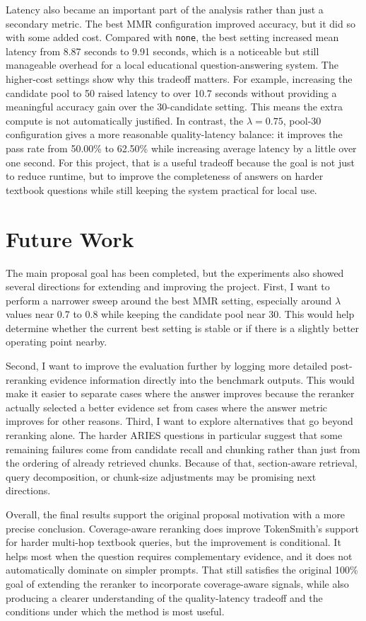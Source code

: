 \documentclass[sigconf]{acmart}
\begin{document}
Latency also became an important part of the analysis rather than just a secondary metric. The best MMR configuration improved accuracy, but it did so with some added cost. Compared with \texttt{none}, the best setting increased mean latency from 8.87 seconds to 9.91 seconds, which is a noticeable but still manageable overhead for a local educational question-answering system. The higher-cost settings show why this tradeoff matters. For example, increasing the candidate pool to 50 raised latency to over 10.7 seconds without providing a meaningful accuracy gain over the 30-candidate setting. This means the extra compute is not automatically justified. In contrast, the \(\lambda=0.75\), pool-30 configuration gives a more reasonable quality-latency balance: it improves the pass rate from 50.00\% to 62.50\% while increasing average latency by a little over one second. For this project, that is a useful tradeoff because the goal is not just to reduce runtime, but to improve the completeness of answers on harder textbook questions while still keeping the system practical for local use.

\section{Future Work}
The main proposal goal has been completed, but the experiments also showed several directions for extending and improving the project. First, I want to perform a narrower sweep around the best MMR setting, especially around \(\lambda\) values near 0.7 to 0.8 while keeping the candidate pool near 30. This would help determine whether the current best setting is stable or if there is a slightly better operating point nearby.

Second, I want to improve the evaluation further by logging more detailed post-reranking evidence information directly into the benchmark outputs. This would make it easier to separate cases where the answer improves because the reranker actually selected a better evidence set from cases where the answer metric improves for other reasons. Third, I want to explore alternatives that go beyond reranking alone. The harder ARIES questions in particular suggest that some remaining failures come from candidate recall and chunking rather than just from the ordering of already retrieved chunks. Because of that, section-aware retrieval, query decomposition, or chunk-size adjustments may be promising next directions.

Overall, the final results support the original proposal motivation with a more precise conclusion. Coverage-aware reranking does improve TokenSmith’s support for harder multi-hop textbook queries, but the improvement is conditional. It helps most when the question requires complementary evidence, and it does not automatically dominate on simpler prompts. That still satisfies the original 100\% goal of extending the reranker to incorporate coverage-aware signals, while also producing a clearer understanding of the quality-latency tradeoff and the conditions under which the method is most useful.
\end{document}
